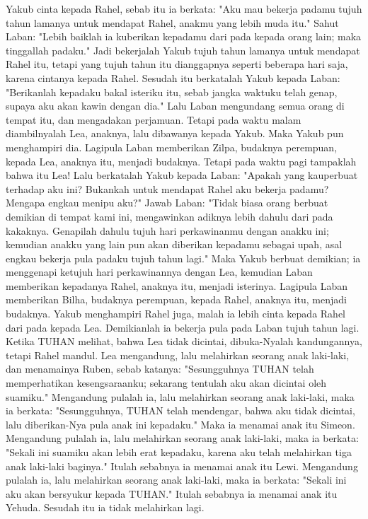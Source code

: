 \begin{biblechapter}
\verse Yakub cinta kepada Rahel, sebab itu ia berkata: "Aku mau bekerja padamu tujuh tahun lamanya untuk mendapat Rahel, anakmu yang lebih muda itu."
\verse Sahut Laban: "Lebih baiklah ia kuberikan kepadamu dari pada kepada orang lain; maka tinggallah padaku."
\verse Jadi bekerjalah Yakub tujuh tahun lamanya untuk mendapat Rahel itu, tetapi yang tujuh tahun itu dianggapnya seperti beberapa hari saja, karena cintanya kepada Rahel.
\verse Sesudah itu berkatalah Yakub kepada Laban: "Berikanlah kepadaku bakal isteriku itu, sebab jangka waktuku telah genap, supaya aku akan kawin dengan dia."
\verse Lalu Laban mengundang semua orang di tempat itu, dan mengadakan perjamuan.
\verse Tetapi pada waktu malam diambilnyalah Lea, anaknya, lalu dibawanya kepada Yakub. Maka Yakub pun menghampiri dia.
\verse Lagipula Laban memberikan Zilpa, budaknya perempuan, kepada Lea, anaknya itu, menjadi budaknya.
\verse Tetapi pada waktu pagi tampaklah bahwa itu Lea! Lalu berkatalah Yakub kepada Laban: "Apakah yang kauperbuat terhadap aku ini? Bukankah untuk mendapat Rahel aku bekerja padamu? Mengapa engkau menipu aku?"
\verse Jawab Laban: "Tidak biasa orang berbuat demikian di tempat kami ini, mengawinkan adiknya lebih dahulu dari pada kakaknya.
\verse Genapilah dahulu tujuh hari perkawinanmu dengan anakku ini; kemudian anakku yang lain pun akan diberikan kepadamu sebagai upah, asal engkau bekerja pula padaku tujuh tahun lagi."
\verse Maka Yakub berbuat demikian; ia menggenapi ketujuh hari perkawinannya dengan Lea, kemudian Laban memberikan kepadanya Rahel, anaknya itu, menjadi isterinya.
\verse Lagipula Laban memberikan Bilha, budaknya perempuan, kepada Rahel, anaknya itu, menjadi budaknya.
\verse Yakub menghampiri Rahel juga, malah ia lebih cinta kepada Rahel dari pada kepada Lea. Demikianlah ia bekerja pula pada Laban tujuh tahun lagi.
 Ketika TUHAN melihat, bahwa Lea tidak dicintai, dibuka-Nyalah kandungannya, tetapi Rahel mandul.
\verse Lea mengandung, lalu melahirkan seorang anak laki-laki, dan menamainya Ruben, sebab katanya: "Sesungguhnya TUHAN telah memperhatikan kesengsaraanku; sekarang tentulah aku akan dicintai oleh suamiku."
\verse Mengandung pulalah ia, lalu melahirkan seorang anak laki-laki, maka ia berkata: "Sesungguhnya, TUHAN telah mendengar, bahwa aku tidak dicintai, lalu diberikan-Nya pula anak ini kepadaku." Maka ia menamai anak itu Simeon.
\verse Mengandung pulalah ia, lalu melahirkan seorang anak laki-laki, maka ia berkata: "Sekali ini suamiku akan lebih erat kepadaku, karena aku telah melahirkan tiga anak laki-laki baginya." Itulah sebabnya ia menamai anak itu Lewi.
\verse Mengandung pulalah ia, lalu melahirkan seorang anak laki-laki, maka ia berkata: "Sekali ini aku akan bersyukur kepada TUHAN." Itulah sebabnya ia menamai anak itu Yehuda. Sesudah itu ia tidak melahirkan lagi.
\end{biblechapter}

